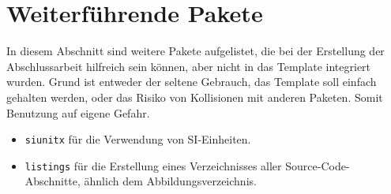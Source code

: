 %
\section{Weiterführende Pakete}\label{sec:addPackages}
In diesem Abschnitt sind weitere Pakete aufgelistet, die bei der Erstellung der Abschlussarbeit hilfreich sein können, aber nicht in das Template integriert wurden. Grund ist entweder der seltene Gebrauch, das Template soll einfach gehalten werden, oder das Risiko von Kollisionen mit anderen Paketen. Somit Benutzung auf eigene Gefahr.

\begin{itemize}
\item \texttt{siunitx} für die Verwendung von SI-Einheiten.
\item \texttt{listings} für die Erstellung eines Verzeichnisses aller Source-Code-Ab\-schnit\-te, ähnlich dem Abbildungsverzeichnis.
\end{itemize}
